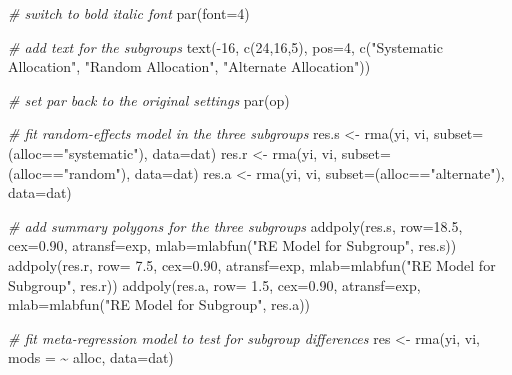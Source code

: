 \documentclass[
]{book}
\newenvironment{Shaded}{\begin{snugshade}}{\end{snugshade}}
\newcommand{\AttributeTok}[1]{\textcolor[rgb]{0.77,0.63,0.00}{#1}}
\newcommand{\CommentTok}[1]{\textcolor[rgb]{0.56,0.35,0.01}{\textit{#1}}}
\newcommand{\DecValTok}[1]{\textcolor[rgb]{0.00,0.00,0.81}{#1}}
\newcommand{\FloatTok}[1]{\textcolor[rgb]{0.00,0.00,0.81}{#1}}
\newcommand{\FunctionTok}[1]{\textcolor[rgb]{0.00,0.00,0.00}{#1}}
\newcommand{\NormalTok}[1]{#1}
\newcommand{\OtherTok}[1]{\textcolor[rgb]{0.56,0.35,0.01}{#1}}
\newcommand{\SpecialCharTok}[1]{\textcolor[rgb]{0.00,0.00,0.00}{#1}}
\newcommand{\StringTok}[1]{\textcolor[rgb]{0.31,0.60,0.02}{#1}}
\begin{document}
\begin{Shaded}
\begin{Highlighting}[]
\CommentTok{\# switch to bold italic font}
\FunctionTok{par}\NormalTok{(}\AttributeTok{font=}\DecValTok{4}\NormalTok{)}

\CommentTok{\# add text for the subgroups}
\FunctionTok{text}\NormalTok{(}\SpecialCharTok{{-}}\DecValTok{16}\NormalTok{, }\FunctionTok{c}\NormalTok{(}\DecValTok{24}\NormalTok{,}\DecValTok{16}\NormalTok{,}\DecValTok{5}\NormalTok{), }\AttributeTok{pos=}\DecValTok{4}\NormalTok{, }\FunctionTok{c}\NormalTok{(}\StringTok{"Systematic Allocation"}\NormalTok{,}
                               \StringTok{"Random Allocation"}\NormalTok{,}
                               \StringTok{"Alternate Allocation"}\NormalTok{))}

\CommentTok{\# set par back to the original settings}
\FunctionTok{par}\NormalTok{(op)}

\CommentTok{\# fit random{-}effects model in the three subgroups}
\NormalTok{res.s }\OtherTok{\textless{}{-}} \FunctionTok{rma}\NormalTok{(yi, vi, }\AttributeTok{subset=}\NormalTok{(alloc}\SpecialCharTok{==}\StringTok{"systematic"}\NormalTok{), }\AttributeTok{data=}\NormalTok{dat)}
\NormalTok{res.r }\OtherTok{\textless{}{-}} \FunctionTok{rma}\NormalTok{(yi, vi, }\AttributeTok{subset=}\NormalTok{(alloc}\SpecialCharTok{==}\StringTok{"random"}\NormalTok{),     }\AttributeTok{data=}\NormalTok{dat)}
\NormalTok{res.a }\OtherTok{\textless{}{-}} \FunctionTok{rma}\NormalTok{(yi, vi, }\AttributeTok{subset=}\NormalTok{(alloc}\SpecialCharTok{==}\StringTok{"alternate"}\NormalTok{),  }\AttributeTok{data=}\NormalTok{dat)}

\CommentTok{\# add summary polygons for the three subgroups}
\FunctionTok{addpoly}\NormalTok{(res.s, }\AttributeTok{row=}\FloatTok{18.5}\NormalTok{, }\AttributeTok{cex=}\FloatTok{0.90}\NormalTok{, }\AttributeTok{atransf=}\NormalTok{exp, }\AttributeTok{mlab=}\FunctionTok{mlabfun}\NormalTok{(}\StringTok{"RE Model for Subgroup"}\NormalTok{, res.s))}
\FunctionTok{addpoly}\NormalTok{(res.r, }\AttributeTok{row=} \FloatTok{7.5}\NormalTok{, }\AttributeTok{cex=}\FloatTok{0.90}\NormalTok{, }\AttributeTok{atransf=}\NormalTok{exp, }\AttributeTok{mlab=}\FunctionTok{mlabfun}\NormalTok{(}\StringTok{"RE Model for Subgroup"}\NormalTok{, res.r))}
\FunctionTok{addpoly}\NormalTok{(res.a, }\AttributeTok{row=} \FloatTok{1.5}\NormalTok{, }\AttributeTok{cex=}\FloatTok{0.90}\NormalTok{, }\AttributeTok{atransf=}\NormalTok{exp, }\AttributeTok{mlab=}\FunctionTok{mlabfun}\NormalTok{(}\StringTok{"RE Model for Subgroup"}\NormalTok{, res.a))}

\CommentTok{\# fit meta{-}regression model to test for subgroup differences}
\NormalTok{res }\OtherTok{\textless{}{-}} \FunctionTok{rma}\NormalTok{(yi, vi, }\AttributeTok{mods =} \SpecialCharTok{\textasciitilde{}}\NormalTok{ alloc, }\AttributeTok{data=}\NormalTok{dat)}


\end{Highlighting}
\end{Shaded}
\end{document}
